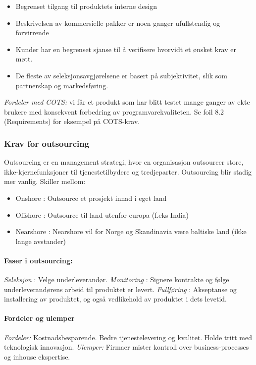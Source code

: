 \begin{itemize}
\item
  Begrenset tilgang til produktets interne design
\item
  Beskrivelsen av kommersielle pakker er noen ganger ufullstendig og
  forvirrende
\item
  Kunder har en begrenset sjanse til å verifisere hvorvidt et ønsket
  krav er møtt.
\item
  De fleste av seleksjonsavgjørelsene er basert på subjektivitet, slik
  som partnerskap og markedsføring.
\end{itemize}
\emph{Fordeler med COTS:} vi får et produkt som har blitt testet mange
ganger av ekte brukere med konsekvent forbedring av
programvarekvaliteten. Se foil 8.2 (Requirements) for eksempel på
COTS-krav.

\subsubsection{Krav for outsourcing}

Outsourcing er en management strategi, hvor en organisasjon outsourcer
store, ikke-kjernefunksjoner til tjenestetilbydere og tredjeparter.
Outsourcing blir stadig mer vanlig. Skiller mellom:

\begin{itemize}
\item
  Onshore : Outsource et prosjekt innad i eget land
\item
  Offshore : Outsource til land utenfor europa (f.eks India)
\item
  Nearshore : Nearshore vil for Norge og Skandinavia være baltiske land
  (ikke lange avstander)
\end{itemize}
\paragraph{Faser i outsourcing:}

\emph{Seleksjon} : Velge underleverandør. \emph{Monitoring} : Signere
kontrakte og følge underleverandørens arbeid til produktet er levert.
\emph{Fullføring} : Akseptanse og installering av produktet, og også
vedlikehold av produktet i dets levetid.

\paragraph{Fordeler og ulemper}

\emph{Fordeler:} Kostnadsbesparende. Bedre tjenestelevering og kvalitet.
Holde tritt med teknologisk innovasjon. \emph{Ulemper:} Firmaer mister
kontroll over business-processes og inhouse ekspertise.

